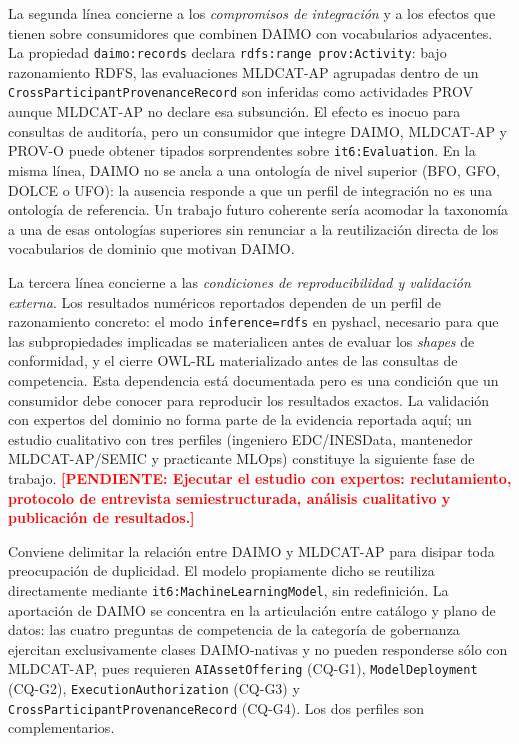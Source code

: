 \documentclass[Afour,sagev,times]{sagej}
\newcommand{\code}[1]{\texttt{#1}}
\newcommand{\TODO}[1]{\textcolor{red}{\textbf{[PENDIENTE: #1]}}}
\begin{document}
La segunda línea concierne a los \emph{compromisos de integración} y a los efectos que tienen sobre consumidores que combinen DAIMO con vocabularios adyacentes. La propiedad \code{daimo:records} declara \code{rdfs:range~prov:Activity}: bajo razonamiento RDFS, las evaluaciones MLDCAT-AP agrupadas dentro de un \code{CrossParticipantProvenanceRecord} son inferidas como actividades PROV aunque MLDCAT-AP no declare esa subsunción. El efecto es inocuo para consultas de auditoría, pero un consumidor que integre DAIMO, MLDCAT-AP y PROV-O puede obtener tipados sorprendentes sobre \code{it6:Evaluation}. En la misma línea, DAIMO no se ancla a una ontología de nivel superior (BFO, GFO, DOLCE o UFO): la ausencia responde a que un perfil de integración no es una ontología de referencia. Un trabajo futuro coherente sería acomodar la taxonomía a una de esas ontologías superiores sin renunciar a la reutilización directa de los vocabularios de dominio que motivan DAIMO.

La tercera línea concierne a las \emph{condiciones de reproducibilidad y validación externa}. Los resultados numéricos reportados dependen de un perfil de razonamiento concreto: el modo \code{inference=rdfs} en pyshacl, necesario para que las subpropiedades implicadas se materialicen antes de evaluar los \emph{shapes} de conformidad, y el cierre OWL-RL materializado antes de las consultas de competencia. Esta dependencia está documentada pero es una condición que un consumidor debe conocer para reproducir los resultados exactos. La validación con expertos del dominio no forma parte de la evidencia reportada aquí; un estudio cualitativo con tres perfiles (ingeniero EDC/INESData, mantenedor MLDCAT-AP/SEMIC y practicante MLOps) constituye la siguiente fase de trabajo. \TODO{Ejecutar el estudio con expertos: reclutamiento, protocolo de entrevista semiestructurada, análisis cualitativo y publicación de resultados.}

Conviene delimitar la relación entre DAIMO y MLDCAT-AP para disipar toda preocupación de duplicidad. El modelo propiamente dicho se reutiliza directamente mediante \code{it6:MachineLearningModel}, sin redefinición. La aportación de DAIMO se concentra en la articulación entre catálogo y plano de datos: las cuatro preguntas de competencia de la categoría de gobernanza ejercitan exclusivamente clases DAIMO-nativas y no pueden responderse sólo con MLDCAT-AP, pues requieren \code{AIAssetOffering} (CQ-G1), \code{ModelDeployment} (CQ-G2), \code{ExecutionAuthorization} (CQ-G3) y \code{CrossParticipantProvenanceRecord} (CQ-G4). Los dos perfiles son complementarios.
\end{document}
